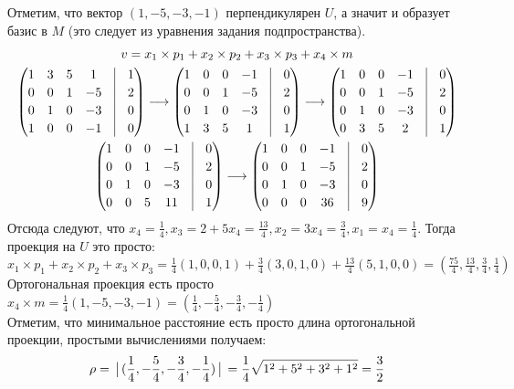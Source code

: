\documentclass[a4paper,11pt]{article}
\begin{document}
Отметим, что вектор $ (1, -5, -3, -1) $ перпендикулярен $ U $, а значит и образует базис в $ M $ (это следует из уравнения задания подпространства).
\begin{gather*}
v = x_1 \times p_1 + x_2 \times p_2 + x_3 \times p_3 + x_4 \times m \\
\begin{pmatrix}
1 & 3 & 5 & 1 & \vrule & 1 \\[2pt]
0 & 0 & 1 & -5 & \vrule &  2 \\[2pt]
0 & 1 & 0 & -3 & \vrule & 0 \\[2pt]
1 & 0 & 0 & -1 & \vrule & 0
\end{pmatrix}
\longrightarrow 
\begin{pmatrix}
1 & 0 & 0 & -1 & \vrule & 0 \\[2pt]
0 & 0 & 1 & -5 & \vrule &  2 \\[2pt]
0 & 1 & 0 & -3 & \vrule & 0 \\[2pt]
1 & 3 & 5 & 1 & \vrule & 1 
\end{pmatrix}
\longrightarrow
\begin{pmatrix}
1 & 0 & 0 & -1 & \vrule & 0 \\[2pt]
0 & 0 & 1 & -5 & \vrule &  2 \\[2pt]
0 & 1 & 0 & -3 & \vrule & 0 \\[2pt]
0 & 3 & 5 & 2 & \vrule & 1 
\end{pmatrix}
\\
\begin{pmatrix}
1 & 0 & 0 & -1 & \vrule & 0 \\[2pt]
0 & 0 & 1 & -5 & \vrule &  2 \\[2pt]
0 & 1 & 0 & -3 & \vrule & 0 \\[2pt]
0 & 0 & 5 & 11 & \vrule & 1 
\end{pmatrix}
\longrightarrow
\begin{pmatrix}
1 & 0 & 0 & -1 & \vrule & 0 \\[2pt]
0 & 0 & 1 & -5 & \vrule &  2 \\[2pt]
0 & 1 & 0 & -3 & \vrule & 0 \\[2pt]
0 & 0 & 0 & 36 & \vrule & 9 
\end{pmatrix}
\end{gather*}
Отсюда следуют, что $ x_4 = \frac14, x_3 = 2 + 5x_4 = \frac{13}{4}, x_2 = 3x_4 = \frac34, x_1 = x_4 = \frac14 $. Тогда проекция на $ U $ это просто: $  x_1 \times p_1 + x_2 \times p_2 + x_3 \times p_3  = \frac14(1, 0, 0, 1) + \frac34(3, 0, 1, 0) + \frac{13}4(5, 1, 0, 0) = (\frac{75}4, \frac{13}4, \frac34, \frac14)$ \\[2pt]
Ортогональная проекция есть просто $ x_4 \times m  = \frac14(1, -5, -3, -1) = (\frac14, -\frac54, -\frac34, -\frac14)$ \\
Отметим, что минимальное расстояние есть просто длина ортогональной проекции, простыми вычислениями получаем:
\begin{gather*}
\rho = \big\arrowvert(\frac14, -\frac54, -\frac34, -\frac14)\big\arrowvert = \frac14\sqrt{1^2 + 5^2 + 3^2 + 1^2} = \frac32
\end{gather*}
\newpage
\end{document}

